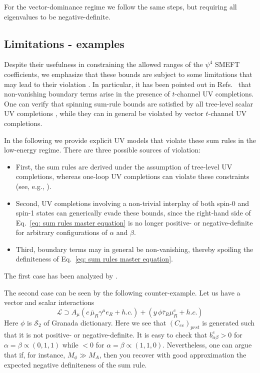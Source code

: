 \documentclass[a4paper,11pt]{article}
\begin{document}
For the vector-dominance regime we follow the same steps, but requiring all eigenvalues to be negative-definite. 

\subsection{Limitations - examples}
Despite their usefulness in constraining the allowed ranges of the $\psi^4$ SMEFT coefficients, we emphasize that these bounds are subject to some limitations that may lead to their violation \cite{Remmen:2020uze,Remmen:2022orj,Azatov:2021ygj,Gu:2020thj}.
In particular, it has been pointed out in Refs.~\cite{Remmen:2020uze,Remmen:2022orj,Azatov:2021ygj} that non-vanishing boundary terms arise in the presence of $t$-channel UV completions. One can verify that spinning sum-rule bounds are satisfied by all tree-level scalar UV completions \cite{deBlas:2017xtg}, while they can in general be violated by vector $t$-channel UV completions.

In the following we provide explicit UV models that violate these sum rules in the low-energy regime. There are three possible sources of violation:
\begin{itemize}
    \item First, the sum rules are derived under the assumption of tree-level UV completions, whereas one-loop UV completions can violate these constraints (see, e.g., \cite{Azatov:2021ygj}).
    \item Second, UV completions involving a non-trivial interplay of both spin-0 and spin-1 states can generically evade these bounds, since the right-hand side of Eq.~\eqref{eq: sum rules master equation} is no longer positive- or negative-definite for arbitrary configurations of $\alpha$ and $\beta$.
    \item Third, boundary terms may in general be non-vanishing, thereby spoiling the definiteness of Eq.~\eqref{eq: sum rules master equation}. 
\end{itemize}

The first case has been analyzed by \cite{Azatov:2021ygj}. 

The second case can be seen by the following counter-example. Let us have a vector and scalar interactions
\begin{equation}
    \mathcal{L}\supset A_\mu\left(c\, \overline{\mu}_R\gamma^\mu e_R+h.c.\right)+\left(y\,\phi\overline{\tau}_R \mu_R^c+h.c.\right)
\end{equation}
Here $\phi$ is $\mathcal{S}_2$ of Granada dictionary. Here we see that $(C_{ee})_{prst}$ is generated such that it is not positive- or negative-definite. It is easy to check that $b_{\alpha\beta}^{e}>0$ for $\alpha=\beta\propto(0,1,1)$ while $<0$ for $\alpha=\beta\propto(1,1,0)$. Nevertheless, one can argue that if, for instance, $M_\phi\gg M_A$, then you recover with good approximation the expected negative definiteness of the sum rule.  
\end{document}
